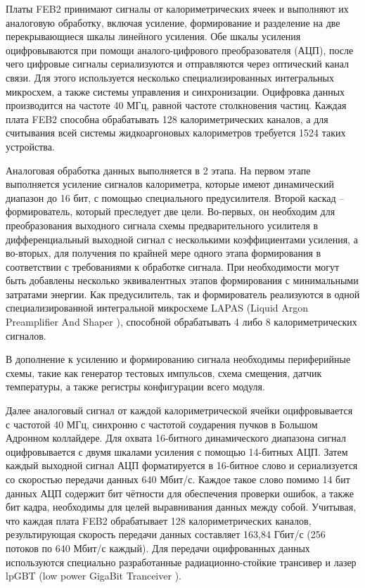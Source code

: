 Платы FEB2 принимают сигналы от калориметрических ячеек и выполняют их аналоговую обработку, включая усиление, формирование и разделение на две перекрывающиеся шкалы линейного усиления. Обе шкалы усиления оцифровываются при помощи аналого-цифрового преобразователя (АЦП), после чего цифровые сигналы сериализуются и отправляются через оптический канал связи. Для этого используется несколько специализированных интегральных микросхем, а также системы управления и синхронизации. Оцифровка данных производится на частоте 40 МГц, равной частоте столкновения частиц. Каждая плата FEB2 способна обрабатывать 128 калориметрических каналов, а для считывания всей системы жидкоаргоновых калориметров требуется 1524 таких устройства.\par
Аналоговая обработка данных выполняется в 2 этапа. На первом этапе выполняется усиление сигналов калориметра, которые имеют динамический диапазон до 16 бит, с помощью специального предусилителя. Второй каскад -- формирователь, который преследует две цели. Во-первых, он необходим для преобразования выходного сигнала схемы предварительного усилителя в дифференциальный выходной сигнал с несколькими коэффициентами усиления, а во-вторых, для получения по крайней мере одного этапа формирования в соответствии с требованиями к обработке сигнала. При необходимости могут быть добавлены несколько эквивалентных этапов формирования с минимальными затратами энергии. Как предусилитель, так и формирователь реализуются в одной специализированной интегральной микросхеме LAPAS (Liquid Argon Preamplifier And Shaper \parencite{lapas}), способной обрабатывать 4 либо 8 калориметрических сигналов.\par
В дополнение к усилению и формированию сигнала необходимы периферийные схемы, такие как генератор тестовых импульсов, схема смещения, датчик температуры, а также регистры конфигурации всего модуля.\par
Далее аналоговый сигнал от каждой калориметрической ячейки оцифровывается с частотой 40 МГц, синхронно с частотой соударения пучков в Большом Адронном коллайдере. Для охвата 16-битного динамического диапазона сигнал оцифровывается с двумя шкалами усиления с помощью 14-битных АЦП. Затем каждый выходной сигнал АЦП форматируется в 16-битное слово и сериализуется со скоростью передачи данных 640 Мбит/с. Каждое такое слово помимо 14 бит данных АЦП содержит бит чётности для обеспечения проверки ошибок, а также бит кадра, необходимы для целей выравнивания данных между собой. Учитывая, что каждая плата FEB2 обрабатывает 128 калориметрических каналов, результирующая скорость передачи данных составляет 163,84 Гбит/с (256 потоков по 640 Мбит/с каждый). Для передачи оцифрованных данных используются специально разработанные радиационно-стойкие трансивер и лазер lpGBT (low power GigaBit Tranceiver \parencite{lpgbt}). \par
